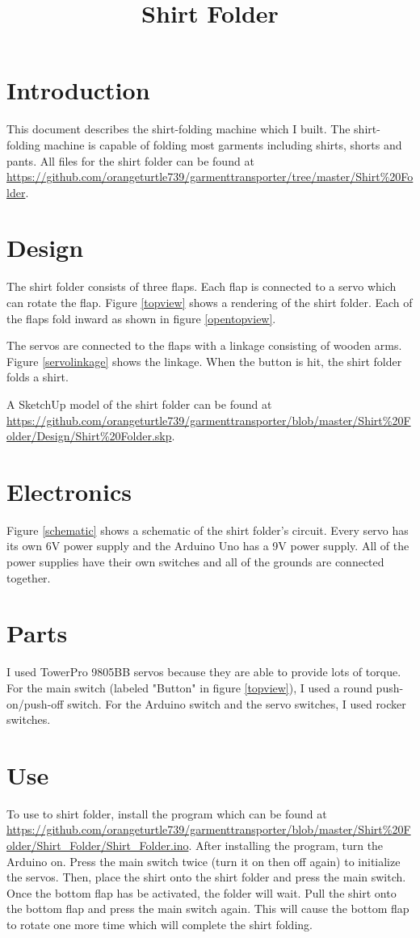 \documentclass[12pt,letterpaper]{article}
\title{Shirt Folder}
\author{}
\date{}
\begin{document}
\maketitle
\section{Introduction}
This document describes the shirt-folding machine which I built. The shirt-folding machine is capable of folding most garments including shirts, shorts and pants. All files for the shirt folder can be found at \url{https://github.com/orangeturtle739/garmenttransporter/tree/master/Shirt\%20Folder}.

\section{Design}
The shirt folder consists of three flaps. Each flap is connected to a servo which can rotate the flap. Figure \ref{topview} shows a rendering of the shirt folder. Each of the flaps fold inward as shown in figure \ref{opentopview}.

The servos are connected to the flaps with a linkage consisting of wooden arms. Figure \ref{servolinkage} shows the linkage. When the button is hit, the shirt folder folds a shirt.

A SketchUp model of the shirt folder can be found at \url{https://github.com/orangeturtle739/garmenttransporter/blob/master/Shirt\%20Folder/Design/Shirt\%20Folder.skp}.

\section{Electronics}
Figure \ref{schematic} shows a schematic of the shirt folder's circuit. Every servo has its own 6V power supply and the Arduino Uno has a 9V power supply. All of the power supplies have their own switches and all of the grounds are connected together.

\section{Parts}
I used TowerPro 9805BB servos because they are able to provide lots of torque. For the main switch (labeled "Button" in figure \ref{topview}), I used a round push-on/push-off switch. For the Arduino switch and the servo switches, I used rocker switches.

\section{Use}
To use to shirt folder, install the program which can be found at \url{https://github.com/orangeturtle739/garmenttransporter/blob/master/Shirt\%20Folder/Shirt_Folder/Shirt_Folder.ino}. After installing the program, turn the Arduino on. Press the main switch twice (turn it on then off again) to initialize the servos. Then, place the shirt onto the shirt folder and press the main switch. Once the bottom flap has be activated, the folder will wait. Pull the shirt onto the bottom flap and press the main switch again. This will cause the bottom flap to rotate one more time which will complete the shirt folding.
\end{document}
